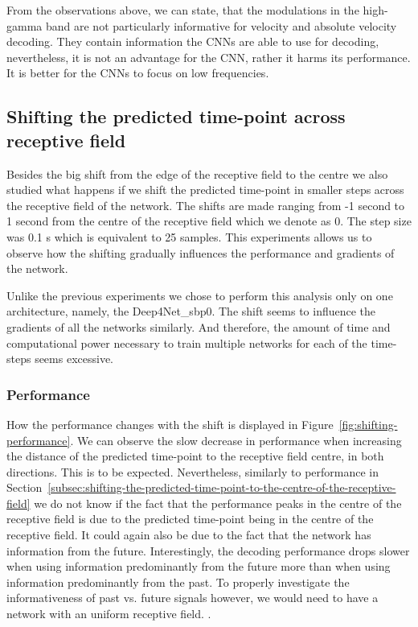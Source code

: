 From the observations above, we can state, that the modulations in the high-gamma band are not particularly informative for velocity and absolute velocity decoding.
They contain information the CNNs are able to use for decoding, nevertheless, it is not an advantage for the CNN, rather it harms its performance.
It is better for the CNNs to focus on low frequencies.


\subsection{Shifting the predicted time-point across receptive field}\label{subsec:shifting-the-predicted-time-point-across-receptive-field}
Besides the big shift from the edge of the receptive field to the centre we also studied what happens if we shift the predicted time-point in smaller steps across the receptive field of the network. 
The shifts are made ranging from  -1 second  to 1 second from the centre of the receptive field which we denote as 0.
The step size was 0.1 s which is equivalent to 25 samples.
This experiments allows us to observe how the shifting gradually influences the performance and gradients of the network. 

Unlike the previous experiments we chose to perform this analysis only on one architecture, namely, the Deep4Net\_sbp0. 
The shift seems to influence the gradients of all the networks similarly.
And therefore, the amount of time and computational power necessary to train multiple networks for each of the time-steps seems excessive.  

\subsubsection{Performance}\label{subsubsec:across-shiftig-performace}
How the performance changes with the shift is displayed in Figure~\ref{fig:shifting-performance}.
We can observe the slow decrease in performance when increasing the distance of the predicted time-point to the receptive field centre, in both directions. 
This is to be expected. 
Nevertheless, similarly to performance in Section~\ref{subsec:shifting-the-predicted-time-point-to-the-centre-of-the-receptive-field} we do not know if the fact that the performance peaks in the centre of the receptive field is due to the predicted time-point being in the centre of the receptive field.
It could again also be due to the fact that the network has information from the future. 
Interestingly, the decoding performance drops slower when using information predominantly from the future more than when using information predominantly from the past.
To properly investigate the informativeness of past vs. future signals however, we would need to have a network with an uniform receptive field. 
.

